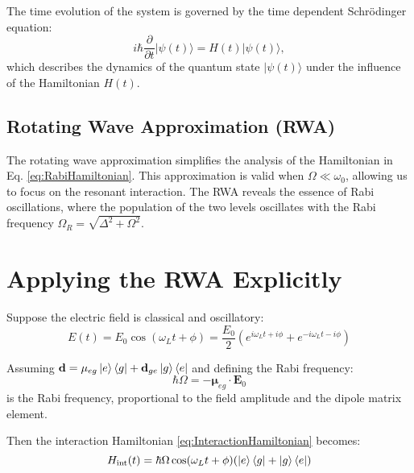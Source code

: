 The time evolution of the system is governed by the time dependent Schrödinger equation:
\begin{equation}
	i\hbar \frac{\partial}{\partial t} |\psi(t)\rangle = H(t) |\psi(t)\rangle,
	\label{eq:SchrodingerEquation}
\end{equation}
which describes the dynamics of the quantum state \(|\psi(t)\rangle\) under the influence of the Hamiltonian \(H(t)\).


\subsection{Rotating Wave Approximation (RWA)}

The rotating wave approximation simplifies the analysis of the Hamiltonian in Eq. \eqref{eq:RabiHamiltonian}.
This approximation is valid when \(\Omega \ll \omega_0\), allowing us to focus on the resonant interaction.
The RWA reveals the essence of Rabi oscillations, where the population of the two levels oscillates with the Rabi frequency \(\Omega_R = \sqrt{\Delta^2 + \Omega^2}\).

\section{Applying the RWA Explicitly}

Suppose the electric field is classical and oscillatory:
\begin{equation}
	E(t) = E_0 \cos(\omega_L t + \phi) = \frac{E_0}{2}\left(e^{i\omega_L t + i \phi} + e^{-i\omega_L t - i \phi}\right)
	\label{eq:ElectricField}
\end{equation}

Assuming \(\mathbf{d} = \mathbf{\mu}_{eg} \ket{e}\bra{g} + \mathbf{d}_{ge} \ket{g}\bra{e}\) and defining the Rabi frequency:
\begin{equation}
	\hbar\Omega = -\mathbf{\mu}_{eg} \cdot \mathbf{E}_0
\end{equation}
is the Rabi frequency, proportional to the field amplitude and the dipole matrix element.

Then the interaction Hamiltonian \eqref{eq:InteractionHamiltonian} becomes:
\begin{equation}
	H_{\text{int}}(t) = \hbar\Omega \cos(\omega_L t + \phi) (\ket{e}\bra{g} + \ket{g}\bra{e})
	\label{eq:InteractionHamiltonian_RABI}
\end{equation}

